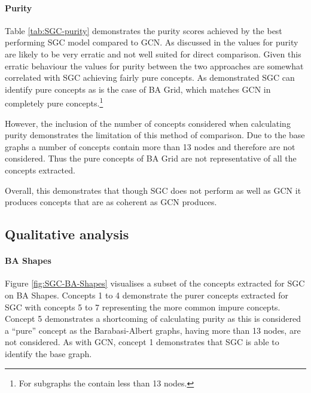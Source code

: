 \paragraph{Purity}


Table \ref{tab:SGC-purity} demonstrates the purity scores achieved by the best performing SGC model compared to GCN.
As discussed in  the values for purity are likely to be very erratic and not well suited for direct comparison.
Given this erratic behaviour the values for purity between the two approaches are somewhat correlated with SGC achieving fairly pure concepts.
As demonstrated SGC can identify pure concepts as is the case of BA Grid, which matches GCN in completely pure concepts.\footnote{For subgraphs the contain less than 13 nodes.}

However, the inclusion of the number of concepts considered when calculating purity demonstrates the limitation of this method of comparison.
Due to the base graphs a number of concepts contain more than 13 nodes and therefore are not considered.
Thus the pure concepts of BA Grid are not representative of all the concepts extracted.

Overall, this demonstrates that though SGC does not perform as well as GCN it produces concepts that are as coherent as GCN produces.

\subsection{Qualitative analysis}
\label{sec:concept-analysis}

\paragraph{BA Shapes}

Figure \ref{fig:SGC-BA-Shapes} visualises a subset of the concepts extracted for SGC on BA Shapes.
Concepts 1 to 4 demonstrate the purer concepts extracted for SGC with concepts 5 to 7 representing the more common impure concepts.
Concept 5 demonstrates a shortcoming of calculating purity as this is considered a ``pure'' concept as the Barabasi-Albert graphs, having more than 13 nodes, are not considered. 
As with GCN, concept 1 demonstrates that SGC is able to identify the base graph.

